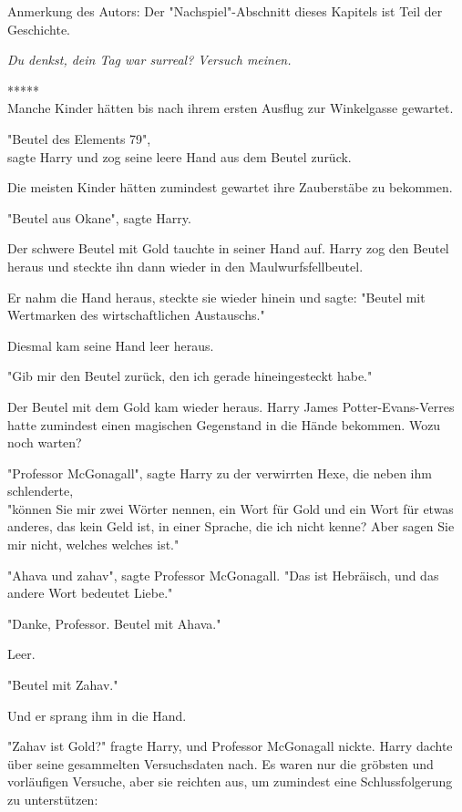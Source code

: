 

\hypertarget{der-planungsirrtum}{%

Anmerkung des Autors: Der "Nachspiel"-Abschnitt dieses Kapitels ist Teil der Geschichte.

\emph{Du denkst, dein Tag war surreal? Versuch meinen.}

*****\\ Manche Kinder hätten bis nach ihrem ersten Ausflug zur Winkelgasse gewartet.

"Beutel des Elements 79",\\ sagte Harry und zog seine leere Hand aus dem Beutel zurück.

Die meisten Kinder hätten zumindest gewartet ihre Zauberstäbe zu bekommen.

"Beutel aus Okane", sagte Harry.

Der schwere Beutel mit Gold tauchte in seiner Hand auf. Harry zog den Beutel heraus und steckte ihn dann wieder in den Maulwurfsfellbeutel.

Er nahm die Hand heraus, steckte sie wieder hinein und sagte: "Beutel mit Wertmarken des wirtschaftlichen Austauschs."

Diesmal kam seine Hand leer heraus.

"Gib mir den Beutel zurück, den ich gerade hineingesteckt habe."

Der Beutel mit dem Gold kam wieder heraus. Harry James Potter-Evans-Verres hatte zumindest einen magischen Gegenstand in die Hände bekommen. Wozu noch warten?

"Professor McGonagall", sagte Harry zu der verwirrten Hexe, die neben ihm schlenderte,\\ "können Sie mir zwei Wörter nennen, ein Wort für Gold und ein Wort für etwas anderes, das kein Geld ist, in einer Sprache, die ich nicht kenne? Aber sagen Sie mir nicht, welches welches ist."

"Ahava und zahav", sagte Professor McGonagall. "Das ist Hebräisch, und das andere Wort bedeutet Liebe."

"Danke, Professor. Beutel mit Ahava."

Leer.

"Beutel mit Zahav."

Und er sprang ihm in die Hand.

"Zahav ist Gold?" fragte Harry, und Professor McGonagall nickte. Harry dachte über seine gesammelten Versuchsdaten nach. Es waren nur die gröbsten und vorläufigen Versuche, aber sie reichten aus, um zumindest eine Schlussfolgerung zu unterstützen:

}
